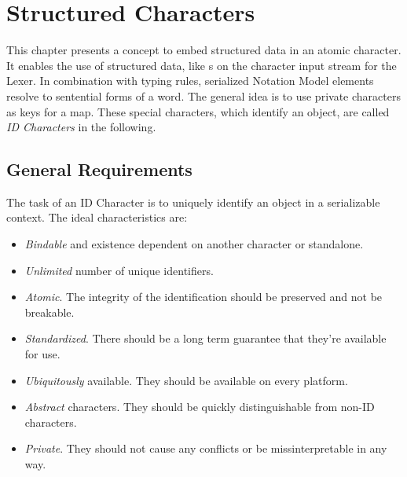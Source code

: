 \section{Structured Characters}
This chapter presents a concept to embed structured data in an atomic character. It enables the use of structured data, like s on the character input stream for the Lexer. In combination with typing rules, serialized Notation Model elements resolve to sentential forms of a word. The general idea is to use private characters as keys for a map. These special characters, which identify an object, are called \emph{ID Characters} in the following.

\subsection{General Requirements}
The task of an ID Character is to uniquely identify an object in a serializable context. 
The ideal characteristics are:
\begin{itemize}
	\item \emph{Bindable} and existence dependent on another character or standalone.
	\item \emph{Unlimited} number of unique identifiers.
	\item \emph{Atomic}. The integrity of the identification should be preserved and not be breakable.
	\item \emph{Standardized}. There should be a long term guarantee that they're available for use.
	\item \emph{Ubiquitously} available. They should be available on every platform.
	\item \emph{Abstract} characters. They should be quickly distinguishable from non-ID characters.
	\item \emph{Private}. They should not cause any conflicts or be missinterpretable in any way.
\end{itemize}

